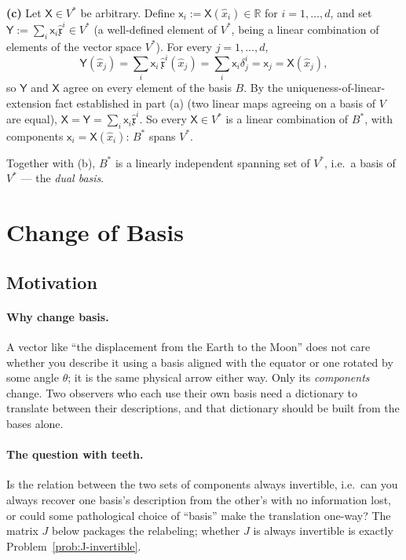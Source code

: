 \documentclass[11pt]{article}
\newcommand{\dual}{V^{*}}
\begin{document}
\textbf{(c)} Let $\mathsf X\in\dual$ be arbitrary. Define $\mathsf x_i:=\mathsf X(\hat x_i)\in\mathbb R$ for $i=1,\dots,d$, and set $\mathsf Y:=\sum_i\mathsf x_i\hat{\mathfrak x}^i\in\dual$ (a well-defined element of $\dual$, being a linear combination of elements of the vector space $\dual$). For every $j=1,\dots,d$,
\[
\mathsf Y(\hat x_j)=\sum_i\mathsf x_i\,\hat{\mathfrak x}^i(\hat x_j)=\sum_i\mathsf x_i\delta^i_j=\mathsf x_j=\mathsf X(\hat x_j),
\]
so $\mathsf Y$ and $\mathsf X$ agree on every element of the basis $B$. By the uniqueness-of-linear-extension fact established in part (a) (two linear maps agreeing on a basis of $V$ are equal), $\mathsf X=\mathsf Y=\sum_i\mathsf x_i\hat{\mathfrak x}^i$. So every $\mathsf X\in\dual$ is a linear combination of $B^*$, with components $\mathsf x_i=\mathsf X(\hat x_i)$: $B^*$ spans $\dual$.

Together with (b), $B^*$ is a linearly independent spanning set of $\dual$, i.e.\ a basis of $\dual$ --- the \emph{dual basis}.

\section{Change of Basis}

\subsection*{Motivation}

\paragraph{Why change basis.}
A vector like ``the displacement from the Earth to the Moon'' does not care whether you describe it using a basis aligned with the equator or one rotated by some angle $\theta$; it is the same physical arrow either way. Only its \emph{components} change. Two observers who each use their own basis need a dictionary to translate between their descriptions, and that dictionary should be built from the bases alone.

\paragraph{The question with teeth.}
Is the relation between the two sets of components always invertible, i.e.\ can you always recover one basis's description from the other's with no information lost, or could some pathological choice of ``basis'' make the translation one-way? The matrix $J$ below packages the relabeling; whether $J$ is always invertible is exactly Problem~\ref{prob:J-invertible}.
\end{document}
